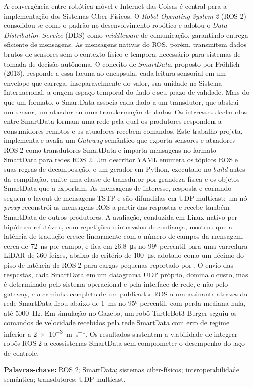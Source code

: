 \documentclass[
    12pt,
    oneside,
    a4paper,
    chapter=TITLE,
    section=TITLE,
    english,
    brazil
]{abntex2}
\begin{document}
\begin{resumo}
A convergência entre robótica móvel e Internet das Coisas é central para a
implementação dos Sistemas Ciber-Físicos. O \textit{Robot Operating System 2}
(ROS 2) consolidou-se como o padrão no desenvolvimento robótico e adotou o
\textit{Data Distribution Service} (DDS) como \textit{middleware} de
comunicação, garantindo entrega eficiente de mensagens. As mensagens nativas do
ROS, porém, transmitem dados brutos de sensores sem o contexto físico e
temporal necessário para sistemas de tomada de decisão autônoma. O conceito de
\textit{SmartData}, proposto por Fröhlich (2018), responde a essa lacuna ao
encapsular cada leitura sensorial em um envelope que carrega, inseparavelmente
do valor, sua unidade no Sistema Internacional, a origem espaço-temporal do
dado e seu prazo de validade. Mais do que um formato, o SmartData associa cada dado a um transdutor,
que abstrai um sensor, um atuador ou uma transformação de dados. Os
interesses declarados entre SmartData formam uma rede pela qual os
produtores respondem a consumidores remotos e os atuadores recebem
comandos. Este trabalho projeta, implementa e
avalia um \textit{Gateway} semântico que exporta sensores e atuadores ROS 2
como transdutores SmartData e importa mensagens no formato SmartData para redes
ROS 2. Um descritor YAML enumera os tópicos ROS e suas regras de decomposição,
e um gerador em Python, executado no \textit{build} antes da compilação, emite
uma classe de transdutor por grandeza física e os objetos SmartData que a
exportam. As mensagens de interesse, resposta e comando seguem o layout de
mensagens TSTP e são difundidas em UDP multicast; um nó \textit{proxy}
reconstrói as mensagens ROS a partir das respostas e recebe também SmartData de
outros produtores. A avaliação, conduzida em Linux nativo por hipóteses
refutáveis, com repetições e intervalos de confiança, mostrou que a latência
de tradução cresce linearmente com o número de campos da mensagem, cerca de
\SI{72}{\nano\second} por campo, e
fica em \SI{26.8}{\micro\second} no 99º percentil para uma varredura LiDAR de
360 feixes, abaixo do critério de \SI{100}{\micro\second}, adotado como um
décimo do piso de latência do ROS 2 para cargas pequenas reportado por
. O envio das respostas, cada SmartData em um
datagrama UDP próprio, domina o custo, mas é determinado pelo sistema
operacional e pela interface de rede, e não pelo gateway, e o caminho completo
de um publicador ROS a um assinante através da rede SmartData ficou abaixo de
\SI{1}{\milli\second} no 95º percentil, com perda mediana nula, até \SI{5000}{\hertz}. Em
simulação no Gazebo, um robô TurtleBot3 Burger seguiu os comandos de
velocidade recebidos pela rede SmartData com erro de regime inferior a
\SI{2e-3}{\meter\per\second}. Os resultados sustentam a viabilidade de
integrar robôs ROS 2 a ecossistemas SmartData sem comprometer o desempenho do
laço de controle.

\vspace{1cm}
\noindent\textbf{Palavras-chave:}
ROS 2; SmartData; sistemas ciber-físicos; interoperabilidade semântica;
transdutores; UDP multicast.
\end{resumo}
\end{document}
